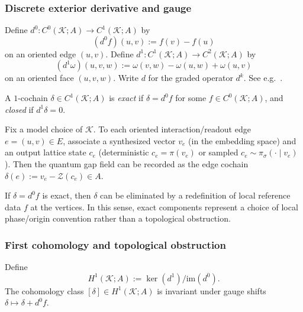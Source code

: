 \subsubsection{Discrete exterior derivative and gauge}
\begin{definition}
\label{def:discrete_exterior_derivative}
Define $d^0:C^0(\mathcal{K};A)\to C^1(\mathcal{K};A)$ by
$$
(d^0 f)(u,v):=f(v)-f(u)
$$
on an oriented edge $(u,v)$.
Define $d^1:C^1(\mathcal{K};A)\to C^2(\mathcal{K};A)$ by
$$
(d^1\omega)(u,v,w):=\omega(v,w)-\omega(u,w)+\omega(u,v)
$$
on an oriented face $(u,v,w)$.
Write $d$ for the graded operator $d^k$.
See e.g.~\cite{Hatcher2002,DesbrunLeokMarsden2005Poincare}.
\end{definition}

\begin{definition}
\label{def:exact_closed_gap}
A $1$-cochain $\delta\in C^1(\mathcal{K};A)$ is \emph{exact} if $\delta=d^0 f$ for some $f\in C^0(\mathcal{K};A)$, and \emph{closed} if $d^1\delta=0$.
\end{definition}

\begin{remark}
Fix a model choice of $\mathcal{K}$.
To each oriented interaction/readout edge $e=(u,v)\in E$, associate a synthesized vector $v_e$ (in the embedding space) and an output lattice state $c_e$ (deterministic $c_e=\pi(v_e)$ or sampled $c_e\sim\pi_\sigma(\cdot\mid v_e)$).
Then the quantum gap field can be recorded as the edge cochain
$
\delta(e):=v_e-\mathcal{Z}(c_e)\in A.
$
\end{remark}

\begin{remark}
If $\delta=d^0 f$ is exact, then $\delta$ can be eliminated by a redefinition of local reference data $f$ at the vertices.
In this sense, exact components represent a choice of local phase/origin convention rather than a topological obstruction.
\end{remark}

\subsubsection{First cohomology and topological obstruction}
\begin{definition}
\label{def:h1_gap}
Define
$$
H^1(\mathcal{K};A):=\ker(d^1)/\mathrm{im}(d^0).
$$
The cohomology class $[\delta]\in H^1(\mathcal{K};A)$ is invariant under gauge shifts $\delta\mapsto \delta+d^0 f$.
\end{definition}

